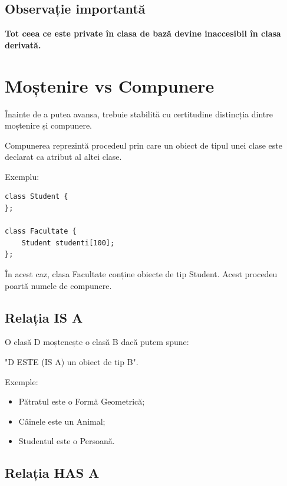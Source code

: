 \documentclass[12pt,a4paper]{article}
\begin{document}
\subsection{Observație importantă}

\textbf{Tot ceea ce este private în clasa de bază devine inaccesibil în clasa derivată.} 





















\section{Moștenire vs Compunere}

Înainte de a putea avansa, trebuie stabilită cu certitudine distincția dintre moștenire și compunere. 

Compunerea reprezintă procedeul prin care un obiect de tipul unei clase este declarat ca atribut al altei clase.

Exemplu:

\begin{verbatim}
class Student {
};

class Facultate {
    Student studenti[100];
};
\end{verbatim}

În acest caz, clasa Facultate conține obiecte de tip Student. Acest procedeu poartă numele de compunere.

\subsection{Relația IS A}

O clasă D moștenește o clasă B dacă putem spune:

"D ESTE (IS A) un obiect de tip B".

Exemple:

\begin{itemize}
\item Pătratul este o Formă Geometrică;
\item Câinele este un Animal;
\item Studentul este o Persoană.
\end{itemize}

\subsection{Relația HAS A}
\end{document}
